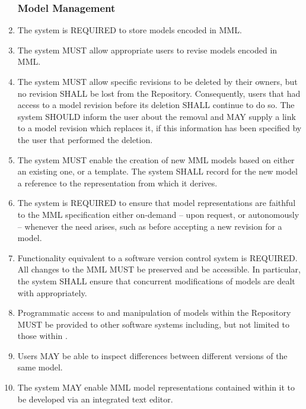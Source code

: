\begin{enumerate}[1]
\subsubsection{Model Management}
\item The system is REQUIRED to store models encoded in MML. 

\item The system MUST allow appropriate users to revise models encoded in MML. 

\item The system MUST allow specific revisions to be deleted by their owners, but no revision SHALL be lost from the Repository. Consequently, users that had access to a model revision before its deletion SHALL continue to do so. The system SHOULD inform the user about the removal and MAY supply a link to a model revision which replaces it, if this information has been specified by the user that performed the deletion. 

\item The system MUST enable the creation of new MML models based on either an existing one, or a template. The system SHALL record for the new model a reference  to the representation from which it derives.

\item The system is REQUIRED to ensure that model representations are faithful to the MML specification either on-demand -- upon request, or autonomously -- whenever the need arises, such as before accepting a new revision for a model. 

\item Functionality equivalent to a software version control system is REQUIRED. All changes to the MML MUST be preserved and be accessible. In particular, the system SHALL ensure that concurrent modifications of models are dealt with appropriately.

\item Programmatic access to and manipulation of models within the Repository MUST be provided to other software systems including, but not limited to those within \ddmore. 

\item Users MAY be able to inspect differences between different versions of the same model.

\item The system MAY enable MML model representations contained within it to be developed via an integrated text editor.


\end{enumerate}
